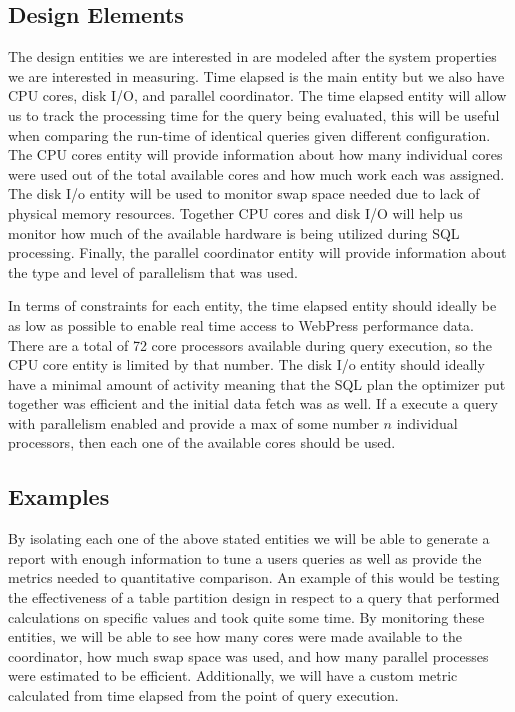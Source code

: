 \documentclass[draftclsnofoot, onecolumn, compsoc, 10pt]{IEEEtran}
\begin{document}
\subsection{Design Elements}
The design entities we are interested in are modeled after the system properties we are interested in measuring.
Time elapsed is the main entity but we also have CPU cores, disk I/O, and parallel coordinator.
The time elapsed entity will allow us to track the processing time for the query being evaluated, this will be useful when comparing the run-time of identical queries given different configuration.
The CPU cores entity will provide information about how many individual cores were used out of the total available cores and how much work each was assigned.
The disk I/o entity will be used to monitor swap space needed due to lack of physical memory resources.
Together CPU cores and disk I/O will help us monitor how much of the available hardware is being utilized during SQL processing.
Finally, the parallel coordinator entity will provide information about the type and level of parallelism that was used.

In terms of constraints for each entity, the time elapsed entity should ideally be as low as possible to enable real time access to WebPress performance data.
There are a total of 72 core processors available during query execution, so the CPU core entity is limited by that number.
The disk I/o entity should ideally have a minimal amount of activity meaning that the SQL plan the optimizer put together was efficient and the initial data fetch was as well.
If a execute a query with parallelism enabled and provide a max of some number $n$ individual processors, then each one of the available cores should be used.

\subsection{Examples}
By isolating each one of the above stated entities we will be able to generate a report with enough information to tune a users queries as well as provide the metrics needed to quantitative comparison.
An example of this would be testing the effectiveness of a table partition design in respect to a query that performed calculations on specific values and took quite some time.
By monitoring these entities, we will be able to see how many cores were made available to the coordinator, how much swap space was used, and how many parallel processes were estimated to be efficient.
Additionally, we will have a custom metric calculated from time elapsed from the point of query execution.
\end{document}
